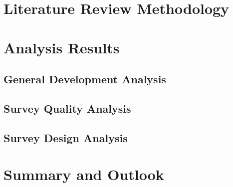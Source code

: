 \documentclass[12pt,a4paper]{article}
\begin{document}
\section{Literature Review Methodology}
\label{02_literature_review_methodology}


\section{Analysis Results}
\label{03_analysis_results}

\subsection{General Development Analysis}
\label{03_01_general_development_analysis}


\subsection{Survey Quality Analysis}
\label{03_02_survey_quality_analysis}


\subsection{Survey Design Analysis}
\label{03_04_survey_design_analysis}


\section{Summary and Outlook}
\label{04_summary_and_outlook}


\newpage
\printbibliography
\end{document}
